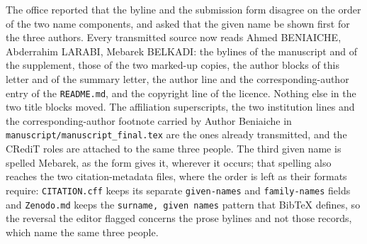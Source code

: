 \documentclass[11pt,a4paper]{article}
\begin{document}
The office reported that the byline and the submission form disagree on the order of the
two name components, and asked that the given name be shown first for the three authors.
Every transmitted source now reads Ahmed BENIAICHE, Abderrahim LARABI, Mebarek BELKADI:
the bylines of the manuscript and of the supplement, those of the two marked-up copies,
the author blocks of this letter and of the summary letter, the author line and the
corresponding-author entry of the \texttt{README.md}, and the copyright line of the licence.
Nothing else in the two title blocks moved. The affiliation superscripts, the two
institution lines and the corresponding-author footnote carried by Author Beniaiche in
\texttt{manuscript/}\hspace{0pt}\texttt{manuscript\_final.tex} are the ones already
transmitted, and the CRediT roles are attached to the same three people. The third given
name is spelled Mebarek, as the form gives it, wherever it occurs; that spelling also
reaches the two citation-metadata files, where the order is left as their formats require:
\texttt{CITATION.cff} keeps its separate \texttt{given-names} and \texttt{family-names}
fields and \texttt{Zenodo.md} keeps the \texttt{surname, given names} pattern that BibTeX
defines, so the reversal the editor flagged concerns the prose bylines and not those
records, which name the same three people.
\end{document}
